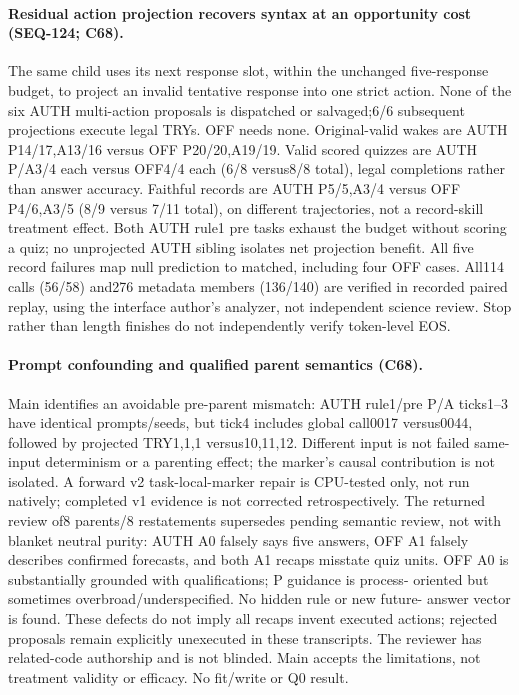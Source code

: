 \documentclass{article}
\begin{document}
\paragraph{Residual action projection recovers syntax at an opportunity cost (SEQ-124; C68).}
The same child uses its next response slot, within the unchanged five-response
budget, to project an invalid tentative response into one strict action. None
of the six AUTH multi-action proposals is dispatched or salvaged;6/6 subsequent
projections execute legal TRYs. OFF needs none. Original-valid wakes are AUTH
P14/17,A13/16 versus OFF P20/20,A19/19. Valid scored quizzes are AUTH P/A3/4 each
versus OFF4/4 each (6/8 versus8/8 total), legal completions rather than answer
accuracy. Faithful records are AUTH P5/5,A3/4 versus OFF P4/6,A3/5 (8/9 versus
7/11 total), on different trajectories, not a record-skill treatment effect.
Both AUTH rule1 pre tasks exhaust the budget without scoring a quiz; no
unprojected AUTH sibling isolates net projection benefit. All five record
failures map null prediction to matched, including four OFF cases. All114
calls (56/58) and276 metadata members (136/140) are verified in recorded paired
replay, using the interface author's analyzer, not independent science review.
Stop rather than length finishes do not independently verify token-level EOS.

\paragraph{Prompt confounding and qualified parent semantics (C68).}
Main identifies an avoidable pre-parent mismatch: AUTH rule1/pre P/A ticks1--3
have identical prompts/seeds, but tick4 includes global call0017 versus0044,
followed by projected TRY1,1,1 versus10,11,12. Different input is not failed
same-input determinism or a parenting effect; the marker's causal contribution
is not isolated. A forward v2 task-local-marker repair is CPU-tested only, not
run natively; completed v1 evidence is not corrected retrospectively. The
returned review of8 parents/8 restatements supersedes pending semantic review,
not with blanket neutral purity: AUTH A0 falsely says five answers, OFF A1
falsely describes confirmed forecasts, and both A1 recaps misstate quiz units.
OFF A0 is substantially grounded with qualifications; P guidance is process-
oriented but sometimes overbroad/underspecified. No hidden rule or new future-
answer vector is found. These defects do not imply all recaps invent executed
actions; rejected proposals remain explicitly unexecuted in these transcripts.
The reviewer has related-code authorship and is not blinded. Main accepts the
limitations, not treatment validity or efficacy. No fit/write or Q0 result.
\end{document}
